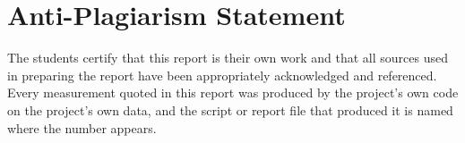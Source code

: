 \chapter*{Anti-Plagiarism Statement}
The students certify that this report is their own work and that all sources used in preparing the report have been appropriately acknowledged and referenced. Every measurement quoted in this report was produced by the project's own code on the project's own data, and the script or report file that produced it is named where the number appears.
